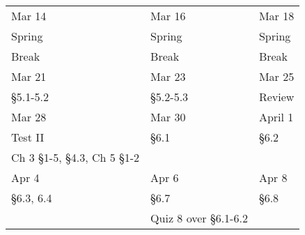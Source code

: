 \documentclass[11pt]{article}
\begin{document}
\begin{tabular}{|l|l|l|}
\hline
Mar 14& Mar 16 &Mar 18 \\
Spring&Spring&Spring\\
Break&Break&Break\\
\hline
Mar 21& Mar 23 & Mar 25 \\
\S 5.1-5.2& \S 5.2-5.3 &Review \\
\hline
Mar 28&Mar 30& April 1\\
Test II & \S 6.1 & \S 6.2 \\
Ch 3 \S 1-5, \S 4.3, Ch 5 \S 1-2 \quad&&\\
\hline
Apr 4 & Apr 6 & Apr 8 \\
\S 6.3, 6.4 & \S 6.7 & \S 6.8 \\
& Quiz 8 over \S 6.1-6.2 & \\
\hline
\end{tabular}
\end{document}
